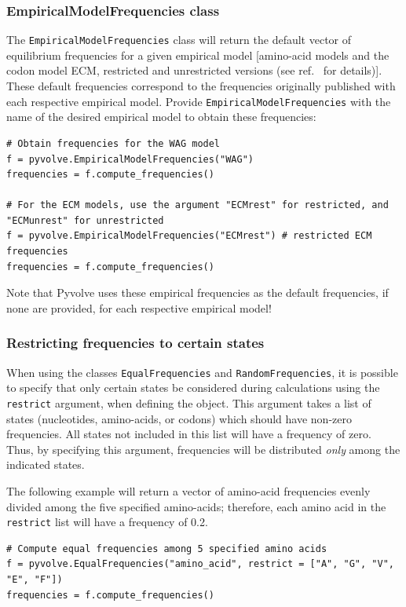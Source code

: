 \documentclass{article}
\newcommand{\code}[1]{\texttt{\small{#1}}}
\begin{document}
\subsubsection{EmpiricalModelFrequencies class}
The \code{EmpiricalModelFrequencies} class will return the default vector of equilibrium frequencies for a given empirical model [amino-acid models and the codon model ECM, restricted and unrestricted versions (see ref.\ \citep{ECM} for details)]. These default frequencies correspond to the frequencies originally published with each respective empirical model. Provide \code{EmpiricalModelFrequencies} with the name of the desired empirical model to obtain these frequencies:
\begin{lstlisting}
# Obtain frequencies for the WAG model
f = pyvolve.EmpiricalModelFrequencies("WAG")
frequencies = f.compute_frequencies()

# For the ECM models, use the argument "ECMrest" for restricted, and "ECMunrest" for unrestricted
f = pyvolve.EmpiricalModelFrequencies("ECMrest") # restricted ECM frequencies
frequencies = f.compute_frequencies()
\end{lstlisting}
Note that Pyvolve uses these empirical frequencies as the default frequencies, if none are provided, for each respective empirical model!


\subsubsection{Restricting frequencies to certain states}

When using the classes \code{EqualFrequencies} and \code{RandomFrequencies}, it is possible to specify that only certain states be considered during calculations using the \code{restrict} argument, when defining the object. This argument takes a list of states (nucleotides, amino-acids, or codons) which should have non-zero frequencies. All states not included in this list will have a frequency of zero. Thus, by specifying this argument, frequencies will be distributed \emph{only} among the indicated states. 

The following example will return a vector of amino-acid frequencies evenly divided among the five specified amino-acids; therefore, each amino acid in the \code{restrict} list will have a frequency of 0.2.
\begin{lstlisting}
# Compute equal frequencies among 5 specified amino acids
f = pyvolve.EqualFrequencies("amino_acid", restrict = ["A", "G", "V", "E", "F"])
frequencies = f.compute_frequencies()
\end{lstlisting}
\end{document}
